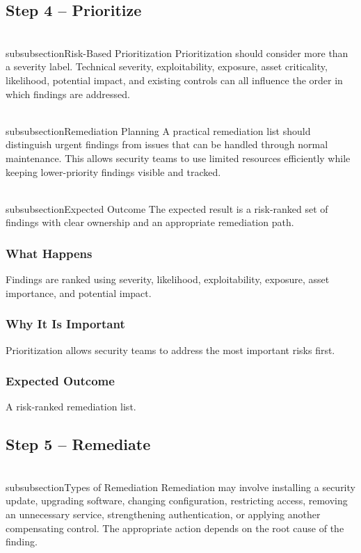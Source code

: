 \documentclass[11pt,a4paper]{article}
\begin{document}
\subsection{Step 4 – Prioritize}
\\subsubsection{Risk-Based Prioritization}
Prioritization should consider more than a severity label. Technical severity, exploitability, exposure, asset criticality, likelihood, potential impact, and existing controls can all influence the order in which findings are addressed.

\\subsubsection{Remediation Planning}
A practical remediation list should distinguish urgent findings from issues that can be handled through normal maintenance. This allows security teams to use limited resources efficiently while keeping lower-priority findings visible and tracked.

\\subsubsection{Expected Outcome}
The expected result is a risk-ranked set of findings with clear ownership and an appropriate remediation path.

\subsubsection{What Happens}
Findings are ranked using severity, likelihood, exploitability, exposure, asset importance, and potential impact.

\subsubsection{Why It Is Important}
Prioritization allows security teams to address the most important risks first.

\subsubsection{Expected Outcome}
A risk-ranked remediation list.

\subsection{Step 5 – Remediate}
\\subsubsection{Types of Remediation}
Remediation may involve installing a security update, upgrading software, changing configuration, restricting access, removing an unnecessary service, strengthening authentication, or applying another compensating control. The appropriate action depends on the root cause of the finding.
\end{document}
